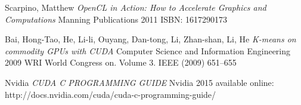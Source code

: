 \begin{thebibliography}{99}
{\sc Scarpino,} Matthew
\emph{OpenCL in Action: How to Accelerate Graphics and Computations}
Manning Publications
2011
ISBN: 1617290173 

{\sc Bai,} Hong-Tao, {\sc He,} Li-li, {\sc Ouyang,} Dan-tong, {\sc Li,} Zhan-shan, {\sc Li, } He
\emph{K-means on commodity GPUs with CUDA}
Computer Science and Information Engineering
2009
WRI World Congress on. Volume 3.
IEEE (2009) 651–655 

Nvidia
\emph{CUDA C PROGRAMMING GUIDE}
Nvidia
2015
available online: http://docs.nvidia.com/cuda/cuda-c-programming-guide/
\end{thebibliography}